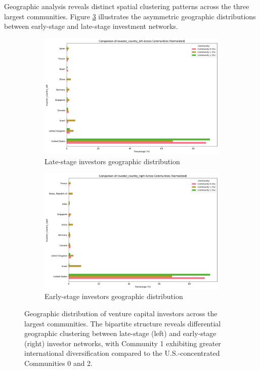 Geographic analysis reveals distinct spatial clustering patterns across the three largest communities. Figure \ref{fig:geographic_distribution} illustrates the asymmetric geographic distributions between early-stage and late-stage investment networks.


\begin{figure}[htbp]
\centering
\begin{subfigure}{0.48\textwidth}
    \centering
    \includegraphics[width=\textwidth]{./assets/investor-left-countries.png}
    \caption{Late-stage investors geographic distribution}
    \label{fig:late_stage_geo}
\end{subfigure}
\hfill
\begin{subfigure}{0.48\textwidth}
    \centering
    \includegraphics[width=\textwidth]{./assets/investor-right-countries.png}
    \caption{Early-stage investors geographic distribution}
    \label{fig:early_stage_geo}
\end{subfigure}
\caption{Geographic distribution of venture capital investors across the largest communities. The bipartite structure reveals differential geographic clustering between late-stage (left) and early-stage (right) investor networks, with Community 1 exhibiting greater international diversification compared to the U.S.-concentrated Communities 0 and 2.}
\label{fig:geographic_distribution}
\end{figure}

